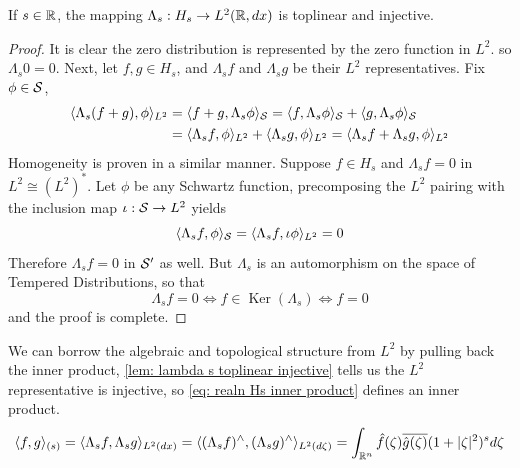 \documentclass[../main-v2-manifolds.tex]{subfiles}
\begin{document}
\begin{lemma}\label{lem: lambda s toplinear injective}
If $s\in\mathbb{R}$, the mapping $\Lambda_s: H_s\to L^2(\mathbb{R},dx)$ is toplinear and injective.
\end{lemma}
\begin{proof}
    It is clear the zero distribution is represented by the zero function in $L^2$. so $\Lambda_s 0 = 0$. Next, let $f,g\in H_s$, and $\Lambda_s f$ and $\Lambda_s g$ be their $L^2$ representatives. Fix $\phi\in \mathcal{S}$, 
    \begin{align*}
    \langle\Lambda_s (f+g), \phi\rangle_{L^2} &= \langle f+g,\Lambda_s \phi\rangle_{\mathcal{S}}= \langle f,\Lambda_s \phi\rangle_{\mathcal{S}} + \langle g,\Lambda_s \phi\rangle_{\mathcal{S}}\\
    &= \langle \Lambda_s f,\phi\rangle_{L^2} + \langle \Lambda_s g,\phi\rangle_{L^2}= \langle \Lambda_s f + \Lambda_s g,\phi\rangle_{L^2}
    \end{align*}
    Homogeneity is proven in a similar manner. Suppose $f\in H_s$ and $\Lambda_s f=0$ in $L^2\cong (L^2)^*$. Let $\phi$ be any Schwartz function, precomposing the $L^2$ pairing with the inclusion map $\iota: \mathcal{S}\to L^2$ yields
    \[
    \langle \Lambda_s f, \phi\rangle_{\mathcal{S}} = \langle \Lambda_s f, \iota\phi\rangle_{L^2} = 0
    \]
    Therefore $\Lambda_s f = 0$ in $\mathcal{S}'$ as well. But $\Lambda_s$ is an automorphism on the space of Tempered Distributions, so that
    \[
    \Lambda_s f = 0 \iff f\in \operatorname{Ker}(\Lambda_s) \iff f = 0
    \]
    and the proof is complete.
\end{proof}

We can borrow the algebraic and topological structure from $L^2$ by pulling back the inner product, \cref{lem: lambda s toplinear injective} tells us the $L^2$ representative is injective, so \cref{eq: realn Hs inner product} defines an inner product.
\begin{equation}\label{eq: realn Hs inner product}
\langle f,g\rangle_{(s)} =  \langle \Lambda_s f,\Lambda_s g\rangle_{L^2(dx)} = \langle (\Lambda_s f)^{\wedge} ,(\Lambda_s g)^{\wedge} \rangle_{L^2(d\zeta)} = \int_{{\mathbb{R}^n}}\hat{f}(\zeta)\overline{\hat{g}(\zeta)}(1+\vert {\zeta} \vert^2)^s d\zeta
\end{equation}
\end{document}
